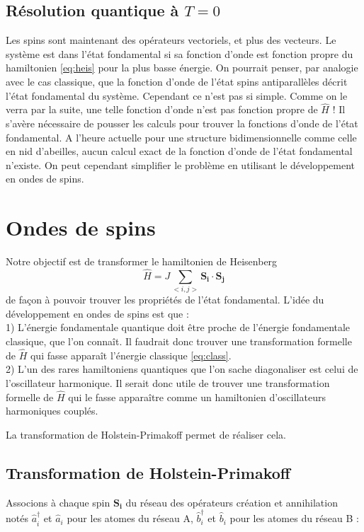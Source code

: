 \documentclass[a4paper, french]{report}
\newcommand{\an}{\hat{a}}
\newcommand{\cre}{\hat{a}^\dagger}
\newcommand{\h}{\ensuremath{\hat{H}}\xspace}
\newcommand{\ban}{\hat{b}}
\newcommand{\bcre}{\hat{b}^\dagger}
\newcommand{\1}{\ensuremath{\ket{\om_1\bom_1}}\xspace}
\newcommand{\2}{\ensuremath{\ket{\om_2\bom_2}}\xspace}
\begin{document}
\subsection{Résolution quantique à $T=0$}
Les spins sont maintenant des opérateurs vectoriels, et plus des vecteurs. Le système est dans l'état fondamental si sa fonction d'onde est fonction propre du hamiltonien \ref{eq:heis} pour la plus basse énergie. On pourrait penser, par analogie avec le cas classique, que la fonction d'onde de l'état spins antiparallèles décrit l'état fondamental du système. Cependant ce n'est pas si simple. Comme on le verra par la suite, une telle fonction d'onde n'est pas fonction propre de $\h$ ! Il s'avère nécessaire de pousser les calculs pour trouver la fonctions d'onde de l'état fondamental. A l'heure actuelle pour une structure bidimensionnelle comme celle en nid d'abeilles, aucun calcul exact de la fonction d'onde de l'état fondamental n'existe. On peut cependant simplifier le problème en utilisant le développement en ondes de spins.

\section{Ondes de spins}
Notre objectif est de transformer le hamiltonien de Heisenberg
\[
	\h=J\sum_{<i,j>}\mathbf{S_i \cdot S_j}
\]
de façon à pouvoir trouver les propriétés de l'état fondamental.
L'idée du développement en ondes de spins est que :\\
1) L'énergie fondamentale quantique doit être proche de l'énergie fondamentale classique, que l'on connaît. Il faudrait donc trouver une transformation formelle de $\h$ qui fasse apparaît l'énergie classique \ref{eq:class}.\\
2) L'un des rares hamiltoniens quantiques que l'on sache diagonaliser est celui de l'oscillateur harmonique. Il serait donc utile de trouver une transformation formelle de $\h$ qui le fasse apparaître comme un hamiltonien d'oscillateurs harmoniques couplés.

La transformation de Holstein-Primakoff permet de réaliser cela.
\subsection{Transformation de Holstein-Primakoff}
Associons à chaque spin $\mathbf{S_i}$ du réseau des opérateurs création et annihilation notés $\cre_i$ et $\an_i$ pour les atomes du réseau A, $\bcre_i$ et $\ban_i$ pour les atomes du réseau B :
\end{document}
